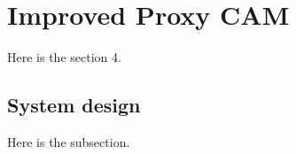 \section{Improved Proxy CAM}

Here is the section 4.

\subsection{System design}

Here is the subsection.